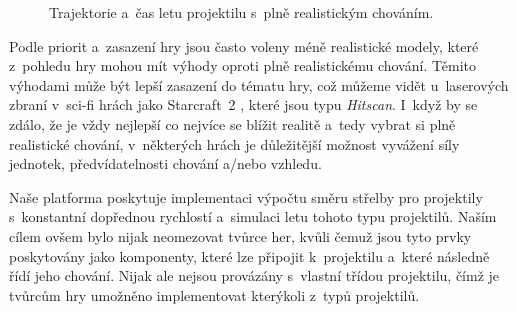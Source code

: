 \begin{figure}[h]
	\centering
	\def\svgwidth{0.7\textwidth}
	
	\caption{Trajektorie a~čas letu projektilu s~plně realistickým chováním.}
	\label{fig:withdragproj}
\end{figure}


Podle priorit a~zasazení hry jsou často voleny méně realistické modely, které z~pohledu hry mohou mít výhody oproti plně realistickému chování. Těmito výhodami může být lepší zasazení do tématu hry, což můžeme vidět u~laserových zbraní v~sci-fi hrách jako Starcraft~2 \citep{site:starcraft}, které jsou typu \textit{Hitscan}. I~když by se zdálo, že je vždy nejlepší co nejvíce se blížit realitě a~tedy vybrat si plně realistické chování, v~některých hrách je důležitější možnost vyvážení síly jednotek, předvídatelnosti chování a/nebo vzhledu.  


Naše platforma poskytuje implementaci výpočtu směru střelby pro projektily s~konstantní dopřednou rychlostí a~simulaci letu tohoto typu projektilů. Naším cílem ovšem bylo nijak neomezovat tvůrce her, kvůli čemuž jsou tyto prvky poskytovány jako komponenty, které lze připojit k~projektilu a~které následně řídí jeho chování. Nijak ale nejsou provázány s~vlastní třídou projektilu, čímž je tvůrcům hry umožněno implementovat kterýkoli z~typů projektilů.


